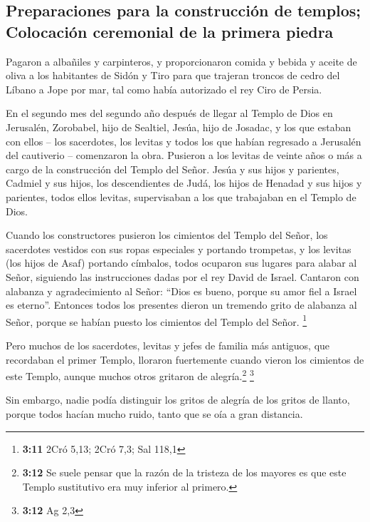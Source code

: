 \hypertarget{preparaciones-para-la-construcciuxf3n-de-templos-colocaciuxf3n-ceremonial-de-la-primera-piedra}{%
\subsection{Preparaciones para la construcción de templos; Colocación
ceremonial de la primera
piedra}\label{preparaciones-para-la-construcciuxf3n-de-templos-colocaciuxf3n-ceremonial-de-la-primera-piedra}}

 Pagaron a albañiles y carpinteros, y proporcionaron
comida y bebida y aceite de oliva a los habitantes de Sidón y Tiro para
que trajeran troncos de cedro del Líbano a Jope por mar, tal como había
autorizado el rey Ciro de Persia.

 En el segundo mes del segundo año después de llegar al
Templo de Dios en Jerusalén, Zorobabel, hijo de Sealtiel, Jesúa, hijo de
Josadac, y los que estaban con ellos -- los sacerdotes, los levitas y
todos los que habían regresado a Jerusalén del cautiverio -- comenzaron
la obra. Pusieron a los levitas de veinte años o más a cargo de la
construcción del Templo del Señor.  Jesúa y sus hijos y
parientes, Cadmiel y sus hijos, los descendientes de Judá, los hijos de
Henadad y sus hijos y parientes, todos ellos levitas, supervisaban a los
que trabajaban en el Templo de Dios.

 Cuando los constructores pusieron los cimientos del
Templo del Señor, los sacerdotes vestidos con sus ropas especiales y
portando trompetas, y los levitas (los hijos de Asaf) portando címbalos,
todos ocuparon sus lugares para alabar al Señor, siguiendo las
instrucciones dadas por el rey David de Israel.  Cantaron
con alabanza y agradecimiento al Señor: ``Dios es bueno, porque su amor
fiel a Israel es eterno''. Entonces todos los presentes dieron un
tremendo grito de alabanza al Señor, porque se habían puesto los
cimientos del Templo del Señor. \footnote{\textbf{3:11} 2Cró 5,13; 2Cró
  7,3; Sal 118,1}

 Pero muchos de los sacerdotes, levitas y jefes de
familia más antiguos, que recordaban el primer Templo, lloraron
fuertemente cuando vieron los cimientos de este Templo, aunque muchos
otros gritaron de alegría.\footnote{\textbf{3:12} Se suele pensar que la
  razón de la tristeza de los mayores es que este Templo sustitutivo era
  muy inferior al primero.} \footnote{\textbf{3:12} Ag 2,3}

 Sin embargo, nadie podía distinguir los gritos de
alegría de los gritos de llanto, porque todos hacían mucho ruido, tanto
que se oía a gran distancia.

